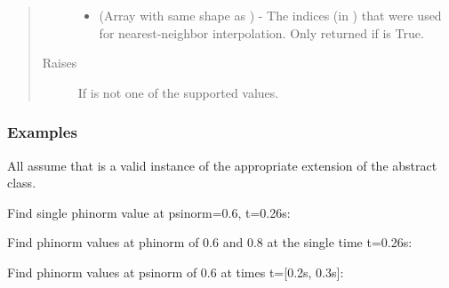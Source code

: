 \documentclass[letterpaper,10pt,english]{sphinxmanual}
\begin{document}
\begin{fulllineitems}
\begin{fulllineitems}
\begin{quote}
\begin{description}
\begin{itemize}
\item {} 
 (Array with same shape as ) - The indices
(in ) that were used for
nearest-neighbor interpolation. Only returned if  is
True.

\end{itemize}


\item[{Raises}] \leavevmode
{} \textendash{} If  is not one of the supported values.

\end{description}\end{quote}
\subsubsection*{Examples}

All assume that  is a valid instance of the appropriate
extension of the {\hyperref[\detokenize{eqtools:eqtools.core.Equilibrium}]{}} abstract class.

Find single phinorm value at psinorm=0.6, t=0.26s:

\begin{sphinxVerbatim}[commandchars=\\\{\}]
    
\end{sphinxVerbatim}

Find phinorm values at phinorm of 0.6 and 0.8 at the
single time t=0.26s:

\begin{sphinxVerbatim}[commandchars=\\\{\}]
   \PYG{p}{[} \PYG{p}{]} 
\end{sphinxVerbatim}

Find phinorm values at psinorm of 0.6 at times t={[}0.2s, 0.3s{]}:

\begin{sphinxVerbatim}[commandchars=\\\{\}]
    \PYG{p}{[} \PYG{p}{]}
\end{sphinxVerbatim}


\end{fulllineitems}
\end{fulllineitems}
\end{document}
